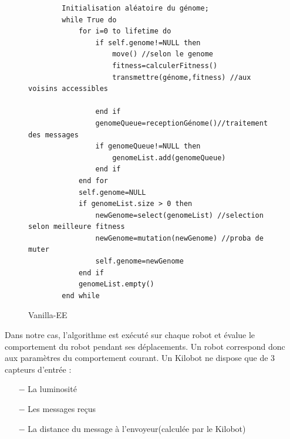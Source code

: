 \documentclass[a4paper]{article}
\begin{document}
\begin{figure}[h!]
	\centering
	\begin{lstlisting}
		Initialisation aléatoire du génome;
		while True do
			for i=0 to lifetime do
				if self.genome!=NULL then
					move() //selon le genome
					fitness=calculerFitness()
					transmettre(génome,fitness) //aux voisins accessibles
	
				end if
				genomeQueue=receptionGénome()//traitement des messages
				if genomeQueue!=NULL then
					genomeList.add(genomeQueue)
				end if
			end for
			self.genome=NULL
			if genomeList.size > 0 then
				newGenome=select(genomeList) //selection selon meilleure fitness	
				newGenome=mutation(newGenome) //proba de muter
				self.genome=newGenome
			end if
			genomeList.empty()
		end while
	\end{lstlisting}
	\caption{Vanilla-EE}
\end{figure}
Dans notre cas, l'algorithme est exécuté sur chaque robot et évalue le comportement du robot pendant ses déplacements. Un robot correspond donc aux paramètres du comportement courant.
Un Kilobot ne dispose que de 3 capteurs d'entrée :
\begin{itemize}
	\item[$-$] La luminosité
	\item [$-$]Les messages reçus
	\item [$-$]La distance du message à l'envoyeur(calculée par le Kilobot)\\
\end{itemize}
\end{document}
